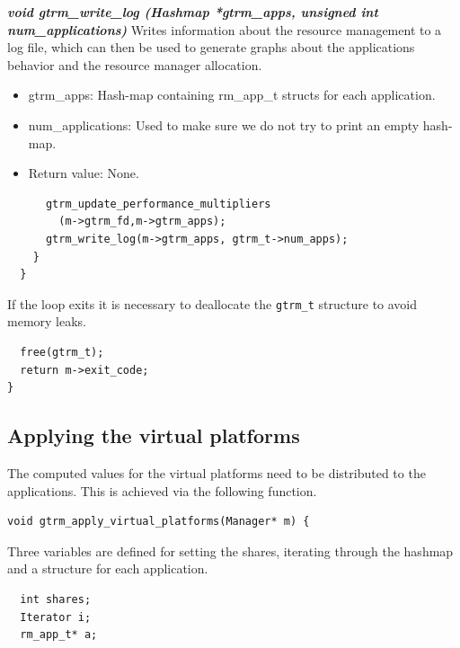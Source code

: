 \documentclass[nobiblatex]{LTHthesis}
\begin{document}
\begin{framed}
	\begin{flushleft}
		\textbf{\emph{{void gtrm\_write\_log \newline
	(Hashmap *gtrm\_apps, unsigned int num\_applications)}}} \newline
		Writes information about the resource management to a log file, 
	which can then be used to generate graphs about the applications
	behavior and the resource manager allocation.
		\begin{itemize} 
		\item gtrm\_apps: Hash-map containing rm\_app\_t structs for 
	  each application.
		\item num\_applications: Used to make sure we do not try to print 
	  an empty hash-map.
		\item Return value: None.
	  \end{itemize}
  \end{flushleft}	
\end{framed}

\begin{lstlisting}
	  gtrm_update_performance_multipliers
		(m->gtrm_fd,m->gtrm_apps);
	  gtrm_write_log(m->gtrm_apps, gtrm_t->num_apps);
	}
  }
\end{lstlisting}

If the loop exits it is necessary to deallocate the \texttt{gtrm\_t} 
structure to avoid memory leaks.
\begin{lstlisting}
  free(gtrm_t);
  return m->exit_code;
}
\end{lstlisting}

\subsection{Applying the virtual platforms}

The computed values for the virtual platforms need to be distributed to 
the applications. This is achieved via the following function.
\begin{lstlisting}
void gtrm_apply_virtual_platforms(Manager* m) {
\end{lstlisting}

Three variables are defined for setting the shares, iterating through 
the hashmap and a structure for each application.
\begin{lstlisting}
  int shares;
  Iterator i;
  rm_app_t* a;
\end{lstlisting}
\end{document}
